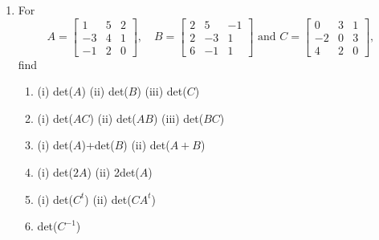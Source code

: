 \begin{enumerate}
\item For
$$
A=\left[ \begin{array}{rrr} 1&5&2\\ -3&4&1\\-1&2&0 \end{array}
\right ], \quad B=\left [ \begin{array}{rrr} 2&5&-1\\ 2&-3&1\\
6&-1&1 \end{array} \right ] \mbox{\ and\ } C=\left [
\begin{array}{rrr} 0&3&1\\ -2&0&3\\ 4&2&0 \end{array} \right ],$$
find
\begin{enumerate}
\item (i) det($A$) \quad (ii) det($B$) \quad (iii) det($C$)
\item (i) det($AC$) \quad (ii) det($AB$) \quad (iii) det($BC$)
\item (i) det($A$)+det($B$) \quad (ii) det($A+B$)
\item (i) det($2A$) \quad (ii) 2det($A$)
\item (i) det($C^t$) \quad (ii) det($CA^t$)
\item det($C^{-1}$)
\end{enumerate}


\end{enumerate}
